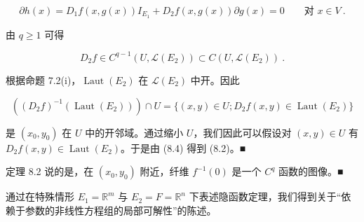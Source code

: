 \begin{theorem}
\begin{subitems}
\begin{equation}
\partial h(x)=D_{1}f(x,g(x))I_{E_{1}}+D_{2}f(x,g(x))\partial g(x)=0\qquad\text{对 }x\in V \ .\tag{8.4}
\end{equation}

由 $ q\ge 1 $ 可得

\[
D_{2}f\in C^{q-1}(U,\mathcal{L}(E_{2}))\subset C(U,\mathcal{L}(E_{2})) \ .
\]

根据命题 7.2(i)，$ \operatorname{Laut}(E_{2}) $ 在 $ \mathcal{L}(E_{2}) $ 中开。因此

\[
\left((D_{2}f)^{-1}(\operatorname{Laut}(E_{2}))\right)\cap U=\{(x,y)\in U;D_{2}f(x,y)\in\operatorname{Laut}(E_{2})\}
\]

是 $ (x_{0},y_{0}) $ 在 $ U $ 中的开邻域。通过缩小 $ U $，我们因此可以假设对 $ (x,y)\in U $ 有 $ D_{2}f(x,y)\in\operatorname{Laut}(E_{2}) $。于是由 (8.4) 得到 (8.2)。\nobreak\hspace{0.35em}■

\end{subitems}

\end{theorem}

\begin{remark}

定理 8.2 说的是，在 $ (x_{0},y_{0}) $ 附近，纤维 $ f^{-1}(0) $ 是一个 $ C^{q} $ 函数的图像。\nobreak\hspace{0.35em}■

通过在特殊情形 $ E_{1}=\mathbb{R}^{m} $ 与 $ E_{2}=F=\mathbb{R}^{n} $ 下表述隐函数定理，我们得到关于“依赖于参数的非线性方程组的局部可解性”的陈述。

\end{remark}

